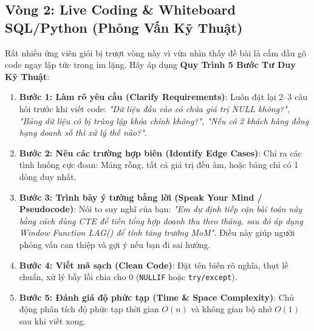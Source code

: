 \subsection{Vòng 2: Live Coding \& Whiteboard SQL/Python (Phỏng Vấn Kỹ Thuật)}
Rất nhiều ứng viên giỏi bị trượt vòng này vì vừa nhìn thấy đề bài là cắm đầu gõ code ngay lập tức trong im lặng. Hãy áp dụng \textbf{Quy Trình 5 Bước Tư Duy Kỹ Thuật}:
\begin{enumerate}
    \item \textbf{Bước 1: Làm rõ yêu cầu (Clarify Requirements)}: Luôn đặt lại 2--3 câu hỏi trước khi viết code: \textit{"Dữ liệu đầu vào có chứa giá trị NULL không?", "Bảng dữ liệu có bị trùng lặp khóa chính không?", "Nếu có 2 khách hàng đồng hạng doanh số thì xử lý thế nào?"}.
    \item \textbf{Bước 2: Nêu các trường hợp biên (Identify Edge Cases)}: Chỉ ra các tình huống cực đoan: Mảng rỗng, tất cả giá trị đều âm, hoặc bảng chỉ có 1 dòng duy nhất.
    \item \textbf{Bước 3: Trình bày ý tưởng bằng lời (Speak Your Mind / Pseudocode)}: Nói to suy nghĩ của bạn: \textit{"Em dự định tiếp cận bài toán này bằng cách dùng CTE để tiền tổng hợp doanh thu theo tháng, sau đó áp dụng Window Function LAG() để tính tăng trưởng MoM"}. Điều này giúp người phỏng vấn can thiệp và gợi ý nếu bạn đi sai hướng.
    \item \textbf{Bước 4: Viết mã sạch (Clean Code)}: Đặt tên biến rõ nghĩa, thụt lề chuẩn, xử lý bẫy lỗi chia cho 0 (\texttt{NULLIF} hoặc \texttt{try/except}).
    \item \textbf{Bước 5: Đánh giá độ phức tạp (Time \& Space Complexity)}: Chủ động phân tích độ phức tạp thời gian $O(n)$ và không gian bộ nhớ $O(1)$ sau khi viết xong.
\end{enumerate}

